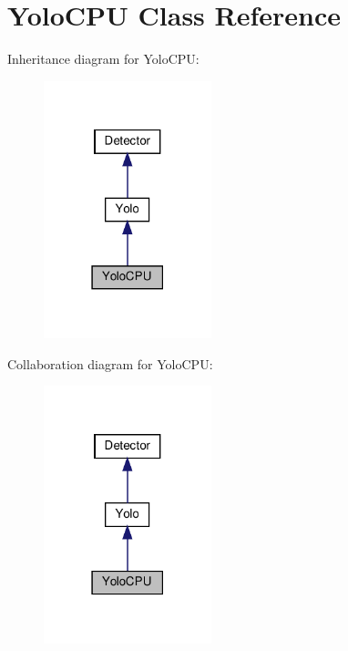 \section{Yolo\+C\+PU Class Reference}
\label{class_yolo_c_p_u}


Inheritance diagram for Yolo\+C\+PU\+:
\nopagebreak
\begin{figure}[H]
\begin{center}
\leavevmode
\includegraphics[width=138pt]{class_yolo_c_p_u__inherit__graph}
\end{center}
\end{figure}


Collaboration diagram for Yolo\+C\+PU\+:
\nopagebreak
\begin{figure}[H]
\begin{center}
\leavevmode
\includegraphics[width=138pt]{class_yolo_c_p_u__coll__graph}
\end{center}
\end{figure}
